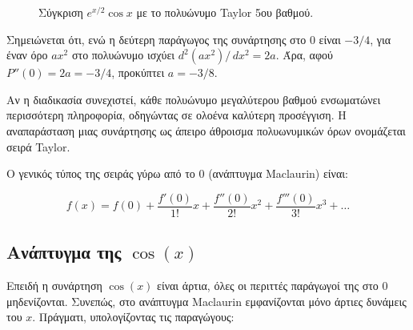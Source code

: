   \begin{figure}\vspace*{-1\baselineskip}
\centering
{}
\caption{Σύγκριση $e^{x/2}\cos x$ με το πολυώνυμο Taylor 5ου βαθμού.}
\label{fig:expcostaylor}
\end{figure}

Σημειώνεται ότι, ενώ η δεύτερη παράγωγος της συνάρτησης στο \(0\) είναι
\(-{3}/{4}\), για έναν όρο \(a x^2\) στο πολυώνυμο ισχύει
\({d^2}(a x^2)/\,{dx^2}=2a\). Άρα, αφού \(P''(0)=2a=-{3}/{4}\),
προκύπτει \(a=-{3}/{8}\).

Αν η διαδικασία συνεχιστεί, κάθε πολυώνυμο μεγαλύτερου βαθμού
ενσωματώνει περισσότερη πληροφορία, οδηγώντας σε ολοένα καλύτερη
προσέγγιση. Η αναπαράσταση μιας συνάρτησης ως άπειρο άθροισμα
πολυωνυμικών όρων ονομάζεται σειρά Taylor.




Ο γενικός τύπος της σειράς γύρω από το \(0\) (ανάπτυγμα Maclaurin)
είναι:

\[f(x) = f(0) + \frac{f'(0)}{1!}x + \frac{f''(0)}{2!}x^2 + \frac{f'''(0)}{3!}x^3 + \dots\]

\subsection{\texorpdfstring{Ανάπτυγμα της
\(\cos(x)\)}{Ανάπτυγμα της \textbackslash cos(x)}}\label{ux3b1ux3bdux3acux3c0ux3c4ux3c5ux3b3ux3bcux3b1-ux3c4ux3b7ux3c2-cosx}

Επειδή η συνάρτηση \(\cos(x)\) είναι άρτια, όλες οι περιττές παράγωγοί
της στο 0 μηδενίζονται. Συνεπώς, στο ανάπτυγμα Maclaurin εμφανίζονται
μόνο άρτιες δυνάμεις του \(x\). Πράγματι, υπολογίζοντας τις παραγώγους:

